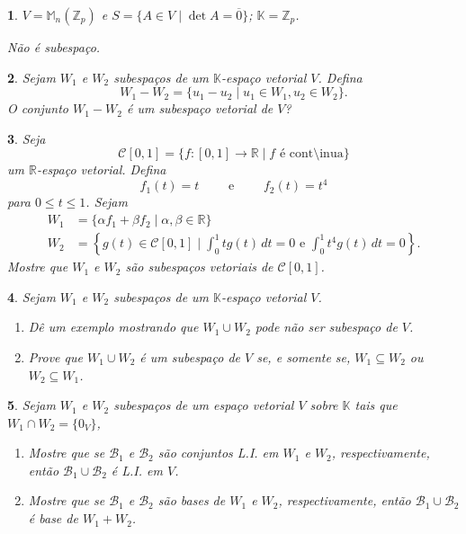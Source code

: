 \documentclass[12pt]{exam}
\newtheorem{exercicio}{}
\newcommand{\integer}{\mathbb{Z}}
\newcommand{\real}{\mathbb{R}}
\newcommand{\cp}[1]{\mathbb{#1}}
\begin{document}
\begin{exercicio}
$V = \cp{M}_n(\integer_p)$ e $S = \{A \in V \mid \det A = \overline{0}\}$; $\cp{K} = \integer_p$.
\begin{solucao}
  N\~ao \'e subespa\c{c}o.
\end{solucao}
\end{exercicio}

\begin{exercicio}
  Sejam $W_1$ e $W_2$  subespa\c{c}os de um $\cp{K}$-espa\c{c}o vetorial $V$. Defina
  \[
    W_1 - W_2 = \{ u_1 - u_2 \mid u_1 \in W_1, u_2 \in W_2\}.
  \]
  O conjunto $W_1 - W_2$ \'e um subespa\c{c}o vetorial de $V$?
\end{exercicio}

\begin{exercicio}
  Seja
  \[
    \mathcal{C}[0,1] = \{ f : [0,1] \to \real \mid f \mbox{ \'e cont{\'\i}nua}\}
  \]
  um $\real$-espa\c{c}o vetorial. Defina
  \[
    f_1(t) = t\qquad \mbox{ e }\qquad f_2(t) = t^4
  \]
  para $0 \le t \le 1$. Sejam
  \begin{align*}
    W_1 &= \{ \alpha f_1 + \beta f_2 \mid \alpha, \beta \in \real\}\\
    W_2 &= \left\{ g(t) \in \mathcal{C}[0,1] \mid \int_0^1tg(t)\,dt = 0 \mbox{ e } \int_0^1t^4g(t)\,dt = 0\right\}.
  \end{align*}
  Mostre que $W_1$ e $W_2$ s\~ao subespa\c{c}os vetoriais de $\mathcal{C}[0,1]$.
\end{exercicio}
\begin{exercicio}
  Sejam $W_1$ e $W_2$ subespa\c{c}os de um $\cp{K}$-espa\c{c}o vetorial $V$.
  \begin{enumerate}[label={\alph*})]
    \item D\^e um exemplo mostrando que $W_1 \cup W_2$ pode n\~ao ser subespa\c{c}o de $V$.
    \item Prove que $W_1 \cup W_2$ \'e um subespa\c{c}o de $V$ se, e somente se, $W_1 \subseteq W_2$ ou $W_2 \subseteq W_1$.
  \end{enumerate}
\end{exercicio}

\begin{exercicio}
  Sejam $W_1$ e $W_2$ subespa\c{c}os de um espa\c{c}o vetorial $V$ sobre $\cp{K}$ tais que $W_1 \cap W_2 = \{0_V\}$,
  \begin{enumerate}[label={\alph*})]
    \item Mostre que se $\mathcal{B}_1$ e $\mathcal{B}_2$ s\~ao conjuntos L.I. em $W_1$ e $W_2$, respectivamente, ent\~ao $\mathcal{B}_1 \cup \mathcal{B}_2$ \'e L.I. em $V$.
    \item Mostre que se $\mathcal{B}_1$ e $\mathcal{B}_2$ s\~ao bases de $W_1$ e $W_2$, respectivamente, ent\~ao $\mathcal{B}_1 \cup \mathcal{B}_2$ \'e base de $W_1 + W_2$.
  \end{enumerate}
\end{exercicio}
\end{document}
